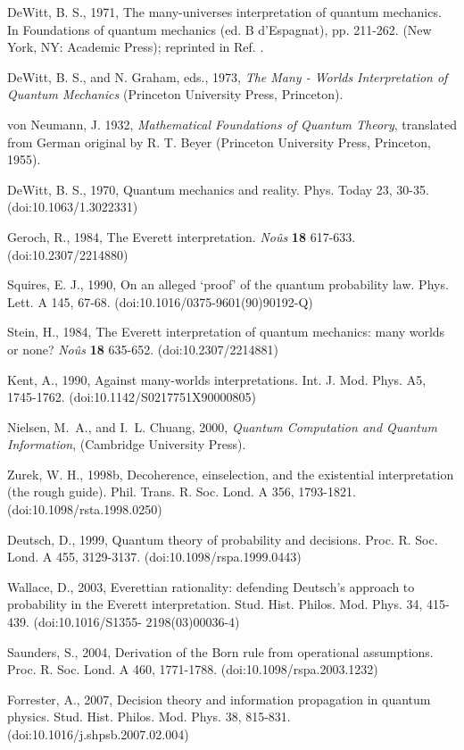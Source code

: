 \documentclass[aps,amsmath,amssymb,amsfonts,12pt]{revtex4-1}
\newcommand{\+}         {\dagger}
\begin{document}
{{{\begin{references}
 DeWitt,  B. S., 1971, The many-universes interpretation of quantum mechanics. In Foundations
of quantum mechanics (ed. B d'Espagnat), pp. 211-262. (New York, NY: Academic Press); reprinted in Ref. \cite{22}.

 DeWitt, B. S., and N. Graham, eds., 1973, {\it The Many - Worlds Interpretation
of Quantum Mechanics} (Princeton University Press, Princeton).

 von Neumann, J. 1932, {\it Mathematical Foundations of Quantum Theory},
translated from German original by R. T. Beyer (Princeton University Press, Princeton, 1955).

 DeWitt,  B. S., 1970, Quantum mechanics and reality. Phys. Today 23, 30-35.
(doi:10.1063/1.3022331)

 Geroch, R., 1984, The Everett interpretation. {\it No\^us} {\bf 18} 617-633. (doi:10.2307/2214880)

 Squires, E. J., 1990, On an alleged `proof' of the quantum probability law. Phys. Lett. A 145, 67-68.
(doi:10.1016/0375-9601(90)90192-Q)

 Stein, H., 1984, The Everett interpretation of quantum mechanics: many worlds or none? {\it No\^us} {\bf 18} 635-652. (doi:10.2307/2214881)

 Kent, A., 1990, Against many-worlds interpretations. Int. J. Mod. Phys. A5, 1745-1762.
(doi:10.1142/S0217751X90000805)

 Nielsen, M.~A., and I.~L. Chuang,  2000, {\it Quantum Computation and Quantum Information}, (Cambridge University Press).

 Zurek, W. H.,  1998b, Decoherence, einselection, and the existential interpretation (the rough
guide). Phil. Trans. R. Soc. Lond. A 356, 1793-1821. (doi:10.1098/rsta.1998.0250)

 Deutsch, D., 1999, Quantum theory of probability and decisions. Proc. R. Soc. Lond. A 455,
3129-3137. (doi:10.1098/rspa.1999.0443)

 Wallace, D., 2003, Everettian rationality: defending Deutsch's approach to probability in
the Everett interpretation. Stud. Hist. Philos. Mod. Phys. 34, 415-439. (doi:10.1016/S1355-
2198(03)00036-4)

 Saunders, S., 2004, Derivation of the Born rule from operational assumptions. Proc. R. Soc. Lond.
A 460, 1771-1788. (doi:10.1098/rspa.2003.1232)

 Forrester, A., 2007, Decision theory and information propagation in quantum physics. Stud.
Hist. Philos. Mod. Phys. 38, 815-831. (doi:10.1016/j.shpsb.2007.02.004)
 

\end{references}}}}
\end{document}
